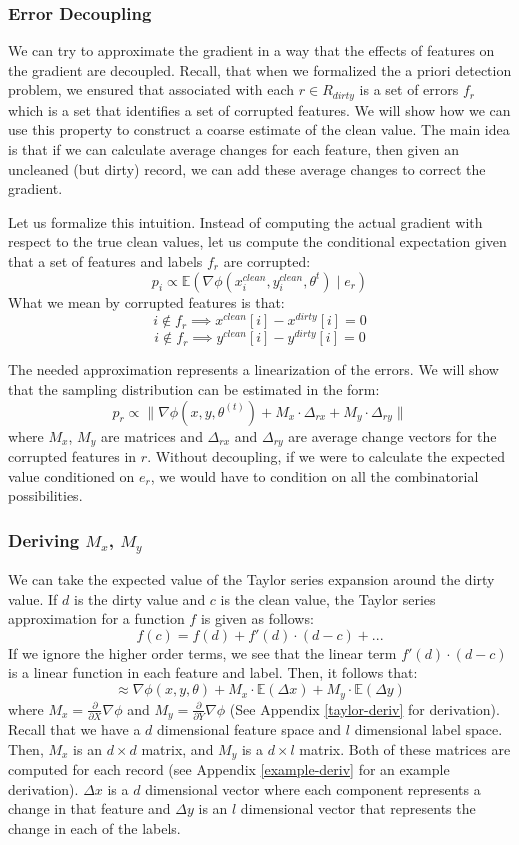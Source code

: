 \subsubsection{Error Decoupling}
We can try to approximate the gradient in a way that the effects of features on the gradient are decoupled.
Recall, that when we formalized the a priori detection problem, we ensured that associated with each $r \in R_{dirty}$ is a set of errors $f_r$ which is a set that identifies a set of corrupted features.
We will show how we can use this property to construct a coarse estimate of the clean value.
The main idea is that if we can calculate average changes for each feature, then given an uncleaned (but dirty) record, we can add these average changes to correct the gradient.

Let us formalize this intuition.
Instead of computing the actual gradient with respect to the 
true clean values, let us compute the conditional expectation given that a set of features and labels $f_r$ are corrupted:
\[
p_i \propto \mathbb{E}(\nabla\phi(x^{clean}_i,y^{clean}_i,\theta^t) \mid e_r)
\]
What we mean by corrupted features is that:
\[
i \notin f_r \implies x^{clean}[i] - x^{dirty}[i] = 0
\]
\[
i \notin f_r \implies y^{clean}[i] - y^{dirty}[i] = 0
\]

The needed approximation represents a linearization of the errors.
We will show that the sampling distribution can be estimated in the form:
\[
p_{r}\propto\|\nabla\phi(x,y,\theta^{(t)}) + M_x \cdot \Delta_{rx} +  M_y \cdot \Delta_{ry}\|
\]
where $M_x$, $M_y$ are matrices and $\Delta_{rx}$ and $\Delta_{ry}$ are average change vectors for the corrupted features in $r$. 
Without decoupling, if we were to calculate the expected value conditioned on $e_r$, we would have to condition on all the combinatorial possibilities.

\subsubsection{Deriving $M_x$, $M_y$}
We can take the expected value of the Taylor series expansion around the dirty value.
If $d$ is the dirty value and $c$ is the clean value, the Taylor series approximation for a function $f$ is given as follows:
\[
f(c) = f(d) + f'(d)\cdot(d-c) + ...
\]
If we ignore the higher order terms, we see that the linear term $f'(d)\cdot(d-c)$ is a linear function in each feature and label.
Then, it follows that:
\[
\approx \nabla\phi(x,y,\theta) + M_x \cdot \mathbb{E}(\Delta x) + M_y \cdot \mathbb{E}(\Delta y)
\]
where $M_x = \frac{\partial}{\partial X}\nabla\phi$ and $M_y = \frac{\partial}{\partial Y}\nabla\phi$ (See Appendix \ref{taylor-deriv} for derivation).
Recall that we have a $d$ dimensional feature space and $l$ dimensional label space.
Then, $M_x$ is an $d \times d$ matrix, and $M_y$ is a $d \times l$ matrix.
Both of these matrices are computed for each record (see Appendix \ref{example-deriv} for an example derivation).
$\Delta x$ is a $d$ dimensional vector where each component represents a change in that feature and $\Delta y$ is an $l$ dimensional vector that represents the change in each of the labels. 


